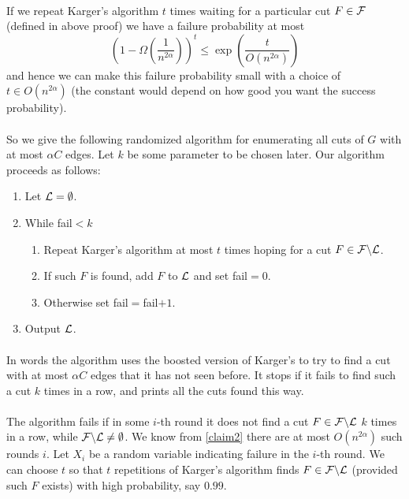 \documentclass[letterpaper,12pt,oneside,onecolumn]{article}
\begin{document}
\paragraph{}
If we repeat Karger's algorithm $t$ times waiting for a particular cut $F \in \mathcal{F}$ (defined in above proof) we have a failure probability at most
$$(1-\Omega(\frac{1}{n^{2\alpha}}))^t \leq \exp(\frac{t}{O(n^{2{\alpha}})})$$
and hence we can make this failure probability small with a choice of $t \in O(n^{2\alpha})$ (the constant would depend on how good you want the success probability).
\paragraph{}
So we give the following randomized algorithm for enumerating all cuts of $G$ with at most $\alpha C$ edges. Let $k$ be some parameter to be chosen later. Our algorithm proceeds as follows:
\begin{enumerate}
\item Let $\mathcal{L} = \emptyset$.
\item While fail$<k$
	\begin{enumerate}
	\item Repeat Karger's algorithm at most $t$ times hoping for a cut $F\in \mathcal{F}\backslash \mathcal{L}$.
	\item If such $F$ is found, add $F$ to $\mathcal{L}$ and set fail$=0$.
	\item Otherwise set fail$=$fail$+1$.
	\end{enumerate}
\item Output $\mathcal{L}$.
\end{enumerate}
\paragraph{}
In words the algorithm uses the boosted version of Karger's to try to find a cut with at most $\alpha C$ edges that it has not seen before. It stops if it fails to find such a cut $k$ times in a row, and prints all the cuts found this way.
\paragraph{}
The algorithm fails if in some $i$-th round it does not find a cut $F \in \mathcal{F}\backslash \mathcal{L}$ $k$ times in a row, while $\mathcal{F} \backslash \mathcal{L}\neq \emptyset$. We know from \ref{claim2} there are at most $O(n^{2\alpha})$ such rounds $i$. Let $X_i$ be a random variable indicating failure in the $i$-th round. We can choose $t$ so that $t$ repetitions of Karger's algorithm finds $F \in \mathcal{F}\backslash \mathcal{L}$ (provided such $F$ exists) with high probability, say $0.99$.
\end{document}
